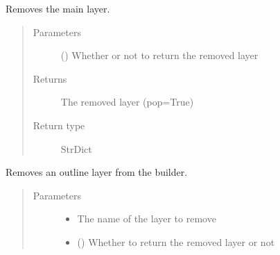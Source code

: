 \documentclass[letterpaper,10pt,english]{sphinxmanual}
\begin{document}
\begin{fulllineitems}
\begin{fulllineitems}
\label{\detokenize{builder:geohexviz.builder.PlotBuilder.remove_hexbin}}
\sphinxAtStartPar
Removes the main layer.
\begin{quote}\begin{description}
\item[{Parameters}] \leavevmode
\sphinxAtStartPar
{} () \textendash{} Whether or not to return the removed layer

\item[{Returns}] \leavevmode
\sphinxAtStartPar
The removed layer (pop=True)

\item[{Return type}] \leavevmode
\sphinxAtStartPar
StrDict

\end{description}\end{quote}

\end{fulllineitems}


\begin{fulllineitems}
\label{\detokenize{builder:geohexviz.builder.PlotBuilder.remove_outline}}
\sphinxAtStartPar
Removes an outline layer from the builder.
\begin{quote}\begin{description}
\item[{Parameters}] \leavevmode\begin{itemize}
\item {} 
\sphinxAtStartPar
{} \textendash{} The name of the layer to remove

\item {} 
\sphinxAtStartPar
{} () \textendash{} Whether to return the removed layer or not


\end{itemize}
\end{description}
\end{quote}
\end{fulllineitems}
\end{fulllineitems}
\end{document}
